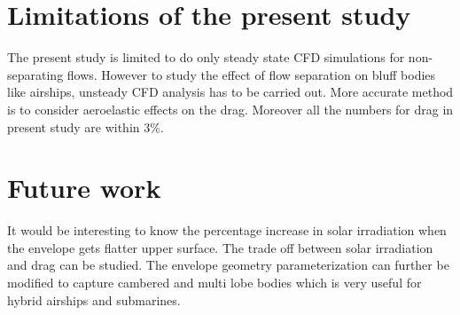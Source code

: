 \section{Limitations of the present study}
The present study is limited to do only steady state CFD simulations for non-separating flows. However to study the effect of flow separation on bluff bodies like airships, unsteady CFD analysis has to be carried out. More accurate method is to consider aeroelastic effects on the drag. Moreover all the numbers for drag in present study are within 3\%.

\section{Future work}
It would be interesting to know the percentage increase in solar irradiation when the envelope gets flatter upper surface. The trade off between solar irradiation and drag can be studied. The envelope geometry parameterization can further be modified to capture cambered and multi lobe bodies which is very useful for hybrid airships and submarines. 
